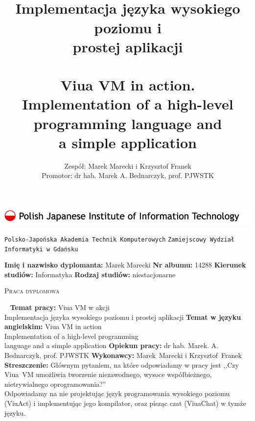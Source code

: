 \documentclass[11pt,twoside,a4paper,titlepage,onecolumn]{book}
\author{Zespół: Marek Marecki i Krzysztof Franek\\Promotor: dr hab. Marek A. Bednarczyk, prof. PJWSTK}
\title{%
    \inzmaintitlePL \\
    \large
    Implementacja języka wysokiego poziomu i \\
    prostej aplikacji\\
    ~\\
    Viua VM in action.\\
    Implementation of a high-level programming language and\\ a simple application}
\newcommand{\inzmaintitlePL}{Viua VM w akcji}
\newcommand{\ViuAct}{ViuAct}
\newcommand{\Dyplomant}{Marek Marecki}
\newcommand{\NumerAlbumu}{14288}
\begin{document}

\begin{titlepage}
    \includegraphics[width=\textwidth]{pjwstk_logo}
    \begin{center}
        {\huge\texttt{Polsko-Japońska Akademia Technik Komputerowych}}
        {\huge\texttt{Zamiejscowy Wydział Informatyki w Gdańsku}}
    \end{center}
    \vspace{1cm}
    {\Large\textbf{Imię i nazwisko dyplomanta:} \Dyplomant}
    \vspace{0.5cm}
    \newline
    {\Large\textbf{Nr albumu:} \NumerAlbumu}
    \vspace{0.5cm}
    \newline
    {\Large\textbf{Kierunek studiów:} Informatyka \hfill \textbf{Rodzaj studiów:} niestacjonarne}

    \vspace{1.5cm}
    \begin{center}
        {\huge\textsc{Praca dyplomowa}}
    \end{center}
    \vspace{1cm}

    ~
    \newline
    {\Large\textbf{Temat pracy:} \inzmaintitlePL\\
         Implementacja języka wysokiego poziomu i
        prostej aplikacji}
    \vspace{1cm}
    \newline
    {\Large\textbf{Temat w języku angielskim:} Viua VM in action\\
         Implementation of a high-level programming\\
         language and a simple application}
    \vspace{1cm}
    \newline
    {\Large\textbf{Opiekun pracy:} dr hab. Marek. A. Bednarczyk, prof. PJWSTK}
    \vspace{0.5cm}
    \newline
    {\Large\textbf{Wykonawcy:} Marek~Marecki i Krzysztof~Franek}
    \vspace{1.5cm}
    \newline
    {\Large\textbf{Streszczenie:} Głównym pytaniem, na które odpowiadamy w pracy
        jest ,,Czy Viua~VM
        umożliwia tworzenie niezawodnego, wysoce współbieżnego, nietrywialnego
        oprogramowania?''\\ Odpowiadamy na nie projektując język
        programowania wysokiego poziomu (\ViuAct) i implementując jego
        kompilator, oraz pisząc czat (ViuaChat) w tymże języku.}


\end{titlepage}
\end{document}
